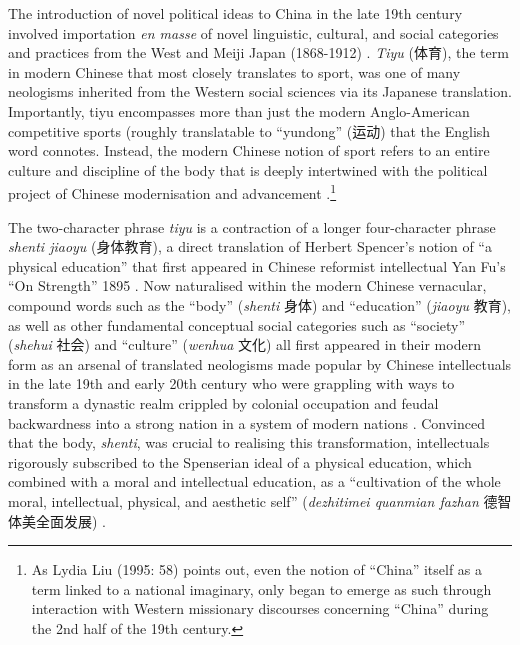 \begin{CJK}{UTF8}{gbsn}
The introduction of novel political ideas to China in the late 19th century involved importation \textit{en masse} of novel linguistic, cultural, and social categories and practices from the West and Meiji Japan (1868-1912) \citep{Liu1995}. \textit{Tiyu} (体育), the term in modern Chinese that most closely translates to sport, was one of many neologisms inherited from the Western social sciences via its Japanese translation.  Importantly, tiyu encompasses more than just the modern Anglo-American competitive sports (roughly translatable to ``yundong'' (运动) that the English word connotes.  Instead, the modern Chinese notion of sport refers to an entire culture and discipline of the body that is deeply intertwined with the political project of Chinese modernisation and advancement \citep{Morris2004}.\footnote{As Lydia Liu (1995: 58) points out, even the notion of ``China'' itself as a term linked to a national imaginary, only began to emerge as such through interaction with Western missionary discourses concerning ``China'' during the 2nd half of the 19th century.}

The two-character phrase \textit{tiyu} is a contraction of a longer four-character phrase \textit{shenti jiaoyu} (身体教育), a direct translation of Herbert Spencer’s notion of  ``a physical education'' that first appeared in Chinese reformist intellectual Yan Fu’s ``On Strength'' 1895 \citep[9-10]{Morris2004}.  Now naturalised within the modern Chinese vernacular, compound words such as the ``body'' (\textit{shenti} 身体) and ``education'' (\textit{jiaoyu} 教育), as well as other fundamental conceptual social categories such as ``society'' (\textit{shehui} 社会) and ``culture'' (\textit{wenhua} 文化) all first appeared in their modern form as an arsenal of translated neologisms made popular by Chinese intellectuals in the late 19th and early 20th century who were grappling with ways to transform a dynastic realm crippled by colonial occupation and feudal backwardness into a strong nation in a system of modern nations \citep{Pusey1983;Schwartz1964;Liu 1995;Huters2005}.   Convinced that the body, \textit{shenti}, was crucial to realising this transformation, intellectuals rigorously subscribed to the Spenserian ideal of a physical education, which combined with a moral and intellectual education, as a ``cultivation of the whole moral, intellectual, physical, and aesthetic self'' (\textit{dezhitimei quanmian fazhan} 德智体美全面发展) \citep[10]{Morris2004}.


\end{CJK}

